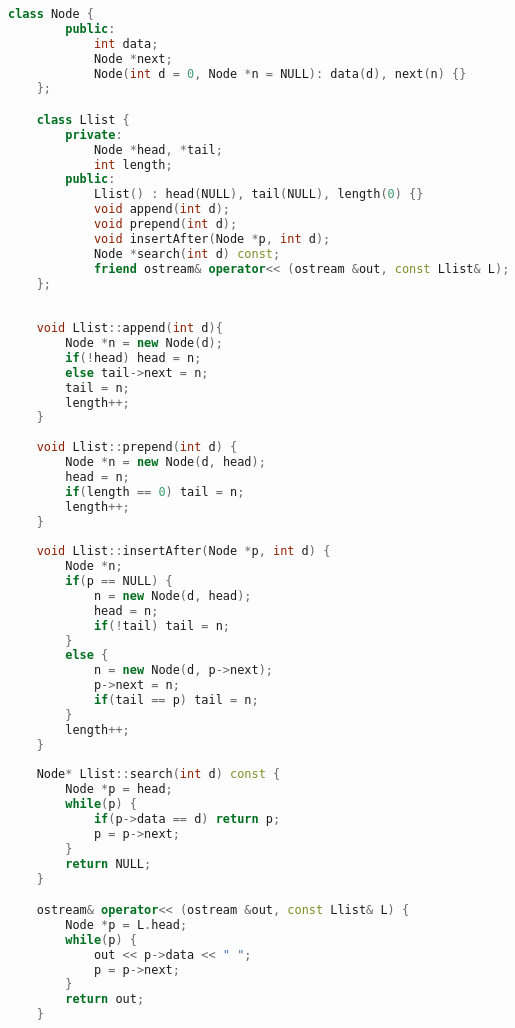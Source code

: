 \documentclass[11 pt]{article}
\begin{document}
\begin{lstlisting}[language=C++]
    class Node {
        public:
            int data;
            Node *next;
            Node(int d = 0, Node *n = NULL): data(d), next(n) {}
    };

    class Llist {
        private:
            Node *head, *tail;
            int length;
        public:
            Llist() : head(NULL), tail(NULL), length(0) {}
            void append(int d);
            void prepend(int d);
            void insertAfter(Node *p, int d);
            Node *search(int d) const;
            friend ostream& operator<< (ostream &out, const Llist& L);
    };
    
    
    void Llist::append(int d){
        Node *n = new Node(d);
        if(!head) head = n;
        else tail->next = n;
        tail = n;
        length++;
    }
    
    void Llist::prepend(int d) {
        Node *n = new Node(d, head);
        head = n;
        if(length == 0) tail = n;
        length++;
    }
    
    void Llist::insertAfter(Node *p, int d) {
        Node *n;
        if(p == NULL) {
            n = new Node(d, head);
            head = n;
            if(!tail) tail = n;
        }
        else {
            n = new Node(d, p->next);
            p->next = n;
            if(tail == p) tail = n;
        }
        length++;
    }
    
    Node* Llist::search(int d) const {
        Node *p = head;
        while(p) {
            if(p->data == d) return p;
            p = p->next;
        }
        return NULL;
    }

    ostream& operator<< (ostream &out, const Llist& L) {
        Node *p = L.head;
        while(p) {
            out << p->data << " ";
            p = p->next;
        }
        return out;
    }
\end{lstlisting}


\end{document}
